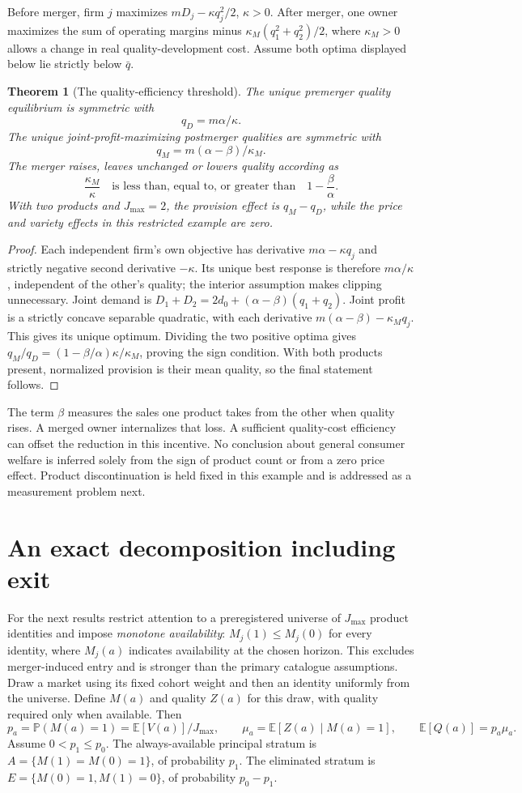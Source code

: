 \documentclass[11pt,a4paper]{article}
\newtheorem{theorem}{Theorem}[section]
\theoremstyle{definition}
\theoremstyle{remark}
\newcommand{\E}{\mathbb E}
\newcommand{\Prb}{\mathbb P}
\begin{document}
Before merger, firm $j$ maximizes $mD_j-\kappa q_j^2/2$, $\kappa>0$. After merger, one owner maximizes the sum of operating margins minus $\kappa_M(q_1^2+q_2^2)/2$, where $\kappa_M>0$ allows a change in real quality-development cost. Assume both optima displayed below lie strictly below $\bar q$.

\begin{theorem}[The quality-efficiency threshold]\label{th:quality}
The unique premerger quality equilibrium is symmetric with
\[
 q_D=m\alpha/\kappa.
\]
The unique joint-profit-maximizing postmerger qualities are symmetric with
\[
 q_M=m(\alpha-\beta)/\kappa_M.
\]
The merger raises, leaves unchanged or lowers quality according as
\[
 \frac{\kappa_M}{\kappa}
 \quad\text{is less than, equal to, or greater than}\quad
 1-\frac\beta\alpha.
\]
With two products and $J_{\max}=2$, the provision effect is $q_M-q_D$, while the price and variety effects in this restricted example are zero.
\end{theorem}
\begin{proof}
Each independent firm's own objective has derivative $m\alpha-\kappa q_j$ and strictly negative second derivative $-\kappa$. Its unique best response is therefore $m\alpha/\kappa$, independent of the other's quality; the interior assumption makes clipping unnecessary. Joint demand is
$D_1+D_2=2d_0+(\alpha-\beta)(q_1+q_2)$. Joint profit is a strictly concave separable quadratic, with each derivative $m(\alpha-\beta)-\kappa_Mq_j$. This gives its unique optimum. Dividing the two positive optima gives
$q_M/q_D=(1-\beta/\alpha)\kappa/\kappa_M$, proving the sign condition. With both products present, normalized provision is their mean quality, so the final statement follows.
\end{proof}

The term $\beta$ measures the sales one product takes from the other when quality rises. A merged owner internalizes that loss. A sufficient quality-cost efficiency can offset the reduction in this incentive. No conclusion about general consumer welfare is inferred solely from the sign of product count or from a zero price effect. Product discontinuation is held fixed in this example and is addressed as a measurement problem next.

\section{An exact decomposition including exit}
For the next results restrict attention to a preregistered universe of $J_{\max}$ product identities and impose \emph{monotone availability}: $M_j(1)\leq M_j(0)$ for every identity, where $M_j(a)$ indicates availability at the chosen horizon. This excludes merger-induced entry and is stronger than the primary catalogue assumptions. Draw a market using its fixed cohort weight and then an identity uniformly from the universe. Define $M(a)$ and quality $Z(a)$ for this draw, with quality required only when available. Then
\[
 p_a=\Prb(M(a)=1)=\E[V(a)]/J_{\max},\qquad
 \mu_a=\E[Z(a)\mid M(a)=1],\qquad
 \E[Q(a)]=p_a\mu_a.
\]
Assume $0<p_1\leq p_0$. The always-available principal stratum is $A=\{M(1)=M(0)=1\}$, of probability $p_1$. The eliminated stratum is $E=\{M(0)=1,M(1)=0\}$, of probability $p_0-p_1$.
\end{document}
